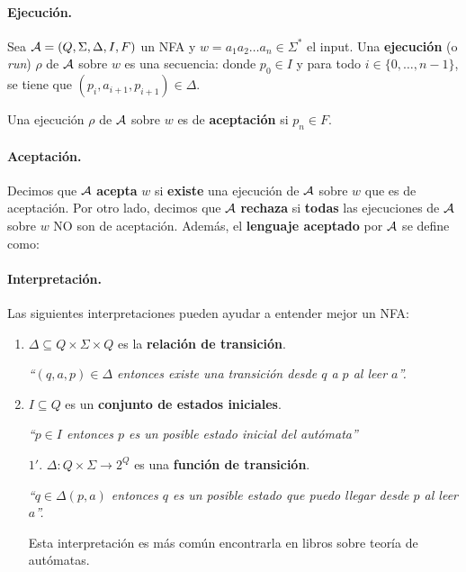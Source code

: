 \paragraph{Ejecución.} Sea $\mathcal{A} = (Q,\Sigma,\Delta, I, F)$ un NFA y $w = a_1 a_2 \ldots a_n \in \Sigma^*$ el input. Una \textbf{ejecución} (o \textit{run}) $\rho$ de $\mathcal{A}$ sobre $w$ es una secuencia:
donde $p_0 \in I$ y para todo $i \in \{0,\ldots,n-1\}$, se tiene que $(p_i, a_{i+1}, p_{i+1}) \in \Delta$. \medbreak

Una ejecución $\rho$ de $\mathcal{A}$ sobre $w$ es de \textbf{aceptación} si $p_n \in F$.

\paragraph{Aceptación.} Decimos que $\mathcal{A}$ \textbf{acepta} $w$ si \textbf{existe} una ejecución de $\mathcal{A}$ sobre $w$ que es de aceptación. Por otro lado, decimos que $\mathcal{A}$ \textbf{rechaza} si \textbf{todas} las ejecuciones de $\mathcal{A}$ sobre $w$ NO son de aceptación. Además, el \textbf{lenguaje aceptado} por $\mathcal{A}$ se define como:

\paragraph{Interpretación.} Las siguientes interpretaciones pueden ayudar a entender mejor un NFA:
\begin{enumerate}
    \item $\Delta \subseteq Q \times \Sigma \times Q$ es la \textbf{relación de transición}.

          \textit{``$(q,a,p) \in \Delta$ entonces existe una transición desde $q$ a $p$ al leer $a$''.}

    \item $I \subseteq Q$ es un \textbf{conjunto de estados iniciales}.

          \textit{``$p \in I$ entonces $p$ es un posible estado inicial del autómata''}

    \item[$1'$.] $\Delta: Q \times \Sigma \to 2^Q$ es una \textbf{función de transición}.

        \textit{``$q \in \Delta(p,a)$ entonces $q$ es un posible estado que puedo llegar desde $p$ al leer $a$''.}

        Esta interpretación es más común encontrarla en libros sobre teoría de autómatas.
\end{enumerate}

